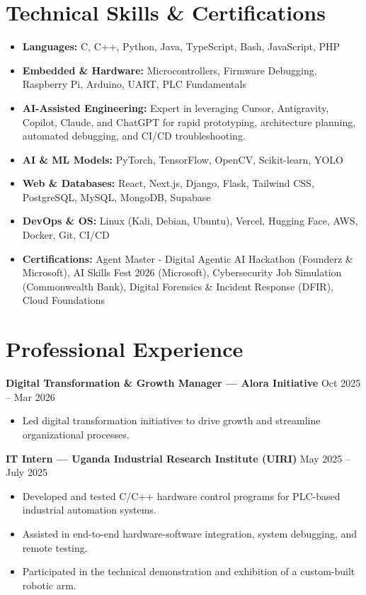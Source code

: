 \documentclass[a4paper,10pt]{article}
\begin{document}
\section{Technical Skills \& Certifications}
\begin{itemize}[leftmargin=*, noitemsep]
    \item \textbf{Languages:} C, C++, Python, Java, TypeScript, Bash, JavaScript, PHP
    \item \textbf{Embedded \& Hardware:} Microcontrollers, Firmware Debugging, Raspberry Pi, Arduino, UART, PLC Fundamentals
    \item \textbf{AI-Assisted Engineering:} Expert in leveraging Cursor, Antigravity, Copilot, Claude, and ChatGPT for rapid prototyping, architecture planning, automated debugging, and CI/CD troubleshooting.
    \item \textbf{AI \& ML Models:} PyTorch, TensorFlow, OpenCV, Scikit-learn, YOLO
    \item \textbf{Web \& Databases:} React, Next.js, Django, Flask, Tailwind CSS, PostgreSQL, MySQL, MongoDB, Supabase
    \item \textbf{DevOps \& OS:} Linux (Kali, Debian, Ubuntu), Vercel, Hugging Face, AWS, Docker, Git, CI/CD
    \item \textbf{Certifications:} Agent Master - Digital Agentic AI Hackathon (Founderz \& Microsoft), AI Skills Fest 2026 (Microsoft), Cybersecurity Job Simulation (Commonwealth Bank), Digital Forensics \& Incident Response (DFIR), Cloud Foundations
\end{itemize}

\section{Professional Experience}
\textbf{Digital Transformation \& Growth Manager — Alora Initiative} \hfill Oct 2025 – Mar 2026
\begin{itemize}[leftmargin=*, noitemsep]
    \item Led digital transformation initiatives to drive growth and streamline organizational processes.
\end{itemize}

\textbf{IT Intern — Uganda Industrial Research Institute (UIRI)} \hfill May 2025 – July 2025
\begin{itemize}[leftmargin=*, noitemsep]
    \item Developed and tested C/C++ hardware control programs for PLC-based industrial automation systems.
    \item Assisted in end-to-end hardware-software integration, system debugging, and remote testing.
    \item Participated in the technical demonstration and exhibition of a custom-built robotic arm.
\end{itemize}
\end{document}
